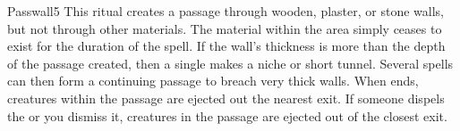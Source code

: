 \begin{spellsection}{Passwall}{5}
\spelldur \durext \dismissable
\spellline
\spelleffect This ritual creates a passage through wooden, plaster, or stone walls, but not through other materials. The material within the area simply ceases to exist for the duration of the spell. If the wall's thickness is more than the depth of the passage created, then a single  makes a niche or short tunnel. Several  spells can then form a continuing passage to breach very thick walls. When  ends, creatures within the passage are ejected out the nearest exit.
\spellnotes If someone dispels the  or you dismiss it, creatures in the passage are ejected out of the closest exit.
\end{spellsection}


